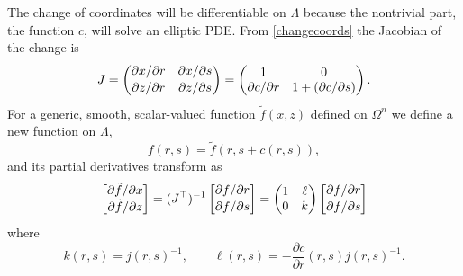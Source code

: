 \documentclass[letterpaper,final,12pt,reqno]{amsart}
\begin{document}
The change of coordinates will be differentiable on $\Lambda$ because the nontrivial part, the function $c$, will solve an elliptic PDE.  From \eqref{changecoords} the Jacobian of the change is
\begin{equation}
J = \begin{pmatrix} \partial x / \partial r & \partial x / \partial s \\ {\large\strut} \partial z / \partial r & \partial z / \partial s \end{pmatrix} = \begin{pmatrix} 1 & 0 \\ \partial c/\partial r & 1+(\partial c/\partial s) \end{pmatrix}. \label{jacchange}
\end{equation}
For a generic, smooth, scalar-valued function $\tilde f(x,z)$ defined on $\Omega^n$ we define a new function on $\Lambda$,
    $$f(r,s) = \tilde f(r,s+c(r,s)),$$
and its partial derivatives transform as
\begin{equation}
\begin{bmatrix} \partial \tilde f / \partial x \\ {\large\strut} \partial \tilde f / \partial z\end{bmatrix} = (J^\top)^{-1} \begin{bmatrix} \partial f / \partial r \\ {\large\strut} \partial f / \partial s\end{bmatrix} = \begin{pmatrix} 1 & \ell \\ 0 & k \end{pmatrix} \begin{bmatrix} \partial f / \partial r \\ {\large\strut} \partial f / \partial s\end{bmatrix} \label{changederivatives}
\end{equation}
where
\begin{equation}
k(r,s) = j(r,s)^{-1}, \qquad \ell(r,s) = - \frac{\partial c}{\partial r}(r,s) j(r,s)^{-1}.
\end{equation}
\end{document}
